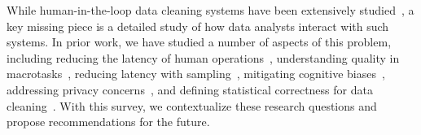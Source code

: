 While human-in-the-loop data cleaning systems have been extensively studied~\cite{gokhale2014corleone,DBLP:conf/cidr/StonebrakerBIBCZPX13, park2014crowdfill,chen2014integrating,YakoutENOI11,ChuKATARA, wisteria}, a key missing piece is a detailed study of how data analysts interact with such systems. 
In prior work, we have studied a number of aspects of this problem, including
reducing the latency of human operations~\cite{DBLP:journals/pvldb/HaasW0F15},
understanding quality in macrotasks~\cite{DBLP:journals/pvldb/HaasAGM15},
reducing latency with sampling~\cite{DBLP:journals/debu/KrishnanWFGKM015},
mitigating cognitive biases~\cite{DBLP:conf/recsys/KrishnanPFG14}, addressing privacy concerns~\cite{krishnan2016priv}, and  defining statistical correctness for data cleaning~\cite{krishnan2015svc, activecleanarxiv}.
With this survey, we contextualize these research questions and propose recommendations for the future.



